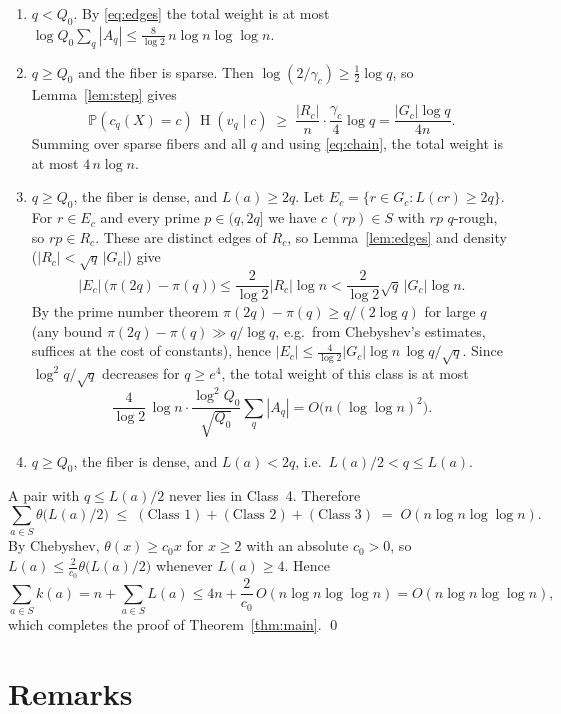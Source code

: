 \documentclass[11pt]{article}
\theoremstyle{remark}
\newcommand{\Pp}{\mathbb{P}}
\DeclareMathOperator{\HH}{H}
\begin{document}
\begin{enumerate}[label=\textbf{Class \arabic*.},leftmargin=*,itemsep=4pt]
\item $q<Q_0$.
By \eqref{eq:edges} the total weight is at most $\log Q_0\sum_q|A_q|\le\frac{8}{\log 2}\,n\log n\log\log n$.

\item $q\ge Q_0$ and the fiber is sparse.
Then $\log(2/\gamma_c)\ge\frac12\log q$, so Lemma~\ref{lem:step} gives
\[
  \Pp(c_q(X)=c)\,\HH(v_q\mid c)\;\ge\;\frac{|R_c|}{n}\cdot\frac{\gamma_c}{4}\log q=\frac{|G_c|\log q}{4n}.
\]
Summing over sparse fibers and all $q$ and using \eqref{eq:chain}, the total weight is at most $4\,n\log n$.

\item $q\ge Q_0$, the fiber is dense, and $L(a)\ge 2q$.
Let $E_c=\{r\in G_c : L(cr)\ge 2q\}$.
For $r\in E_c$ and every prime $p\in(q,2q]$ we have $c\,(rp)\in S$ with $rp$ $q$-rough, so $rp\in R_c$.
These are distinct edges of $R_c$, so Lemma~\ref{lem:edges} and density ($|R_c|<\sqrt q\,|G_c|$) give
\[
  |E_c|\,\bigl(\pi(2q)-\pi(q)\bigr)\le\frac{2}{\log 2}|R_c|\log n<\frac{2}{\log 2}\sqrt q\,|G_c|\log n .
\]
By the prime number theorem $\pi(2q)-\pi(q)\ge q/(2\log q)$ for large $q$ (any bound $\pi(2q)-\pi(q)\gg q/\log q$, e.g.\ from Chebyshev's estimates, suffices at the cost of constants), hence $|E_c|\le\frac{4}{\log 2}|G_c|\log n\,\log q/\sqrt q$.
Since $\log^2q/\sqrt q$ decreases for $q\ge e^4$, the total weight of this class is at most
\[
  \frac{4}{\log2}\,\log n\cdot\frac{\log^2Q_0}{\sqrt{Q_0}}\sum_q|A_q| = O\bigl(n(\log\log n)^2\bigr).
\]

\item $q\ge Q_0$, the fiber is dense, and $L(a)<2q$, i.e.\ $L(a)/2<q\le L(a)$.
\end{enumerate}

A pair with $q\le L(a)/2$ never lies in Class~4.
Therefore
\[
  \sum_{a\in S}\theta\bigl(L(a)/2\bigr)\;\le\;(\text{Class }1)+(\text{Class }2)+(\text{Class }3)\;=\;O(n\log n\log\log n).
\]
By Chebyshev, $\theta(x)\ge c_0x$ for $x\ge2$ with an absolute $c_0>0$, so $L(a)\le\frac{2}{c_0}\theta\bigl(L(a)/2\bigr)$ whenever $L(a)\ge4$.
Hence
\[
  \sum_{a\in S}k(a)=n+\sum_{a\in S}L(a)\le 4n+\frac{2}{c_0}\,O(n\log n\log\log n)=O(n\log n\log\log n),
\]
which completes the proof of Theorem~\ref{thm:main}. \qed

\section{Remarks}
\end{document}
